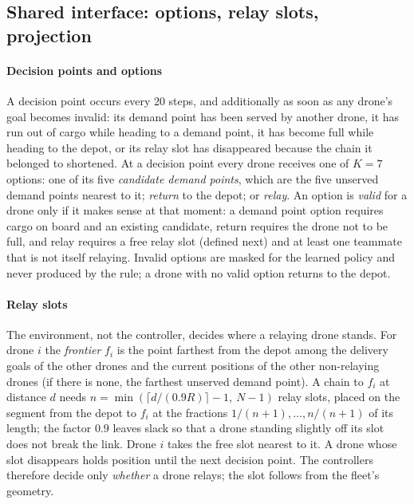 \documentclass[final,5p,times,twocolumn]{elsarticle}
\begin{document}
\subsection{Shared interface: options, relay slots, projection}
\label{sec:shared}

\paragraph{Decision points and options}
A decision point occurs every 20 steps, and additionally as soon as any drone's goal becomes
invalid: its demand point has been served by another drone, it has run out of cargo while heading
to a demand point, it has become full while heading to the depot, or its relay slot has
disappeared because the chain it belonged to shortened. At a decision point every drone receives
one of $K = 7$ options: one of its five \emph{candidate demand points}, which are the five
unserved demand points nearest to it; \emph{return} to the depot; or \emph{relay}. An option is
\emph{valid} for a drone only if it makes sense at that moment: a demand point option requires
cargo on board and an existing candidate, return requires the drone not to be full, and relay
requires a free relay slot (defined next) and at least one teammate that is not itself relaying.
Invalid options are masked for the learned policy and never produced by the rule; a drone
with no valid option returns to the depot.

\paragraph{Relay slots}
The environment, not the controller, decides where a relaying drone stands. For drone $i$ the
\emph{frontier} $f_i$ is the point farthest from the depot among the delivery goals of the other
drones and the current positions of the other non-relaying drones (if there is none, the farthest
unserved demand point). A chain to $f_i$ at distance $d$ needs $n = \min(\lceil d/(0.9R)
\rceil - 1,\ N-1)$ relay slots, placed on the segment from the depot to $f_i$ at the fractions
$1/(n+1), \dots, n/(n+1)$ of its length; the factor $0.9$ leaves slack so that a drone standing
slightly off its slot does not break the link. Drone $i$ takes the free slot nearest to it. A
drone whose slot disappears holds position until the next decision point. The controllers
therefore decide only \emph{whether} a drone relays; the slot follows from the fleet's geometry.
\end{document}
